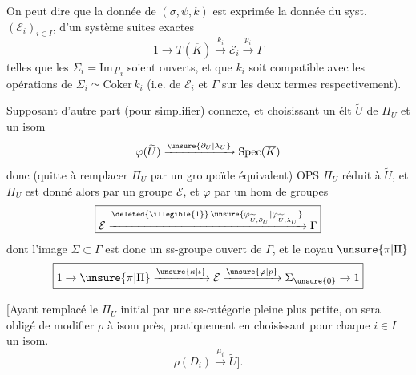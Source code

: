 
On peut dire que la donnée de $(\sigma,\psi,k)$ est exprimée
la donnée du syst. $(\mathcal E_i)_{i\in I}$, d'un système
  suites exactes
\[
\boxed{1\to T(\overline K)\xrightarrow{k_i}\mathcal E_i
\xrightarrow{p_i}\Gamma}
\]
telles que les $\Sigma_i
=\mathrm{Im}\,p_i$ soient ouverts, et que $k_i$ soit compatible
avec les opérations de $\Sigma_i\simeq\mathrm{Coker}\,k_i$
(i.e. de $\mathcal E_i$ et $\Gamma$ sur les deux termes respectivement).



Supposant d'autre part (pour simplifier)
 connexe,
et choisissant un élt $\widetilde U$ de $\Pi_U$ et un isom
\[
\varphi(\widetilde U)\xrightarrow{\unsure{\partial_U|\lambda_U}}
\mathrm{Spec}(\overline K)
\]
donc (quitte à remplacer $\Pi_U$ par un groupoïde équivalent)
OPS $\Pi_U$ réduit à $\widetilde U$, et $\Pi_U$ est donné alors par
un groupe $\mathcal E$, et $\varphi$ par un hom de groupes
\[
\boxed{\mathcal E
\xrightarrow{\deleted{\illegible{1}}\,\unsure{\varphi_{\widetilde U,\partial_U}|\varphi_{\widetilde U,\lambda_U}}}
\Gamma}
\]
dont l'image $\Sigma\subset\Gamma$ est donc un ss-groupe ouvert
de $\Gamma$, et le noyau  $\unsure{\pi|\Pi}$
\[
\boxed{1\to\unsure{\pi|\Pi}\xrightarrow{\unsure{\kappa|\iota}}\mathcal E
\xrightarrow{\unsure{\varphi|p}}\Sigma_{\unsure{0}}\to1}
\]


[Ayant remplacé le $\Pi_U$ initial par une ss-catégorie pleine
plus petite, on sera obligé de modifier $\rho$ à isom près,
pratiquement en choisissant pour chaque $i\in I$ un isom.
\[
\rho(D_i)\xrightarrow{\mu_i}\widetilde U].
\]

